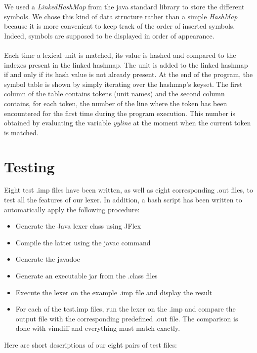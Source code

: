 \documentclass[12pt]{report}
\begin{document}
We used a \textit{LinkedHashMap} from the java standard library to store the different symbols. We chose this kind of data structure rather than
a simple \textit{HashMap} because it is more convenient to keep track of the order of inserted symbols. Indeed, symbols are supposed to be
displayed in order of appearance. \\ \\
Each time a lexical unit is matched, its value is hashed and compared to the indexes present in the linked hashmap. The unit is added to the linked hashmap 
if and only if its hash value is not already present. At the end of the program, the symbol table is shown by simply iterating over the hashmap's keyset. 
The first column of the table contains tokens (unit names) and the second column contains, for each token, the number of the line where the token has
been encountered for the first time during the program execution. This number is obtained by evaluating the variable \textit{yyline} at the moment when
the current token is matched.

\section{Testing}

Eight test .imp files have been written, as well as eight corresponding .out files, to test all the features of our lexer. In addition,
a bash script has been written to automatically apply the following procedure:
\begin{itemize}
\item Generate the Java lexer class using JFlex
\item Compile the latter using the javac command
\item Generate the javadoc
\item Generate an executable jar from the .class files
\item Execute the lexer on the example .imp file and display the result
\item For each of the test.imp files, run the lexer on the .imp and compare the output file with the corresponding predefined .out file. 
The comparison is done with vimdiff and everything must match exactly.
\end{itemize}

Here are short descriptions of our eight pairs of test files:
\end{document}
